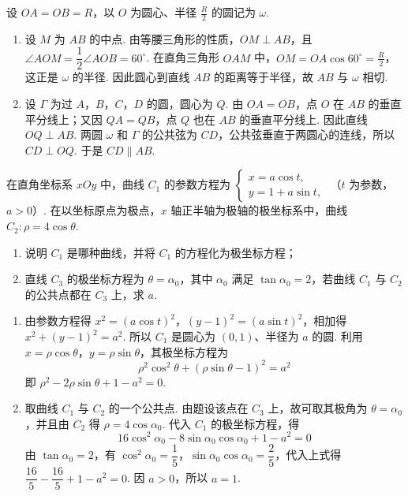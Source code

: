 \begin{solution}
设 \(OA=OB=R\)，以 \(O\) 为圆心、半径 \(\frac{R}{2}\) 的圆记为 \(\omega\).

\begin{enumerate}
\item 设 \(M\) 为 \(AB\) 的中点. 由等腰三角形的性质，\(OM\perp AB\)，且 \(\angle AOM=\dfrac12\angle AOB=60^\circ\). 在直角三角形 \(OAM\) 中，\(OM=OA\cos60^\circ=\frac{R}{2}\)，这正是 \(\omega\) 的半径. 因此圆心到直线 \(AB\) 的距离等于半径，故 \(AB\) 与 \(\omega\) 相切.
\item 设 \(\Gamma\) 为过 \(A\)，\(B\)，\(C\)，\(D\) 的圆，圆心为 \(Q\). 由 \(OA=OB\)，点 \(O\) 在 \(AB\) 的垂直平分线上；又因 \(QA=QB\)，点 \(Q\) 也在 \(AB\) 的垂直平分线上. 因此直线 \(OQ\perp AB\). 两圆 \(\omega\) 和 \(\Gamma\) 的公共弦为 \(CD\)，公共弦垂直于两圆心的连线，所以 \(CD\perp OQ\). 于是 \(CD\parallel AB\).
\end{enumerate}
\end{solution}

\begin{problem}

在直角坐标系 \(xOy\) 中，曲线 \(C_1\) 的参数方程为
\(\begin{cases}
x=a\cos t,\\
y=1+a\sin t,
\end{cases}\)
（\(t\) 为参数，\(a>0\)）.
在以坐标原点为极点，\(x\) 轴正半轴为极轴的极坐标系中，曲线 \(C_2:\rho=4\cos\theta\).

\begin{enumerate}
\item 说明 \(C_1\) 是哪种曲线，并将 \(C_1\) 的方程化为极坐标方程；
\item 直线 \(C_3\) 的极坐标方程为 \(\theta=\alpha_0\)，其中 \(\alpha_0\) 满足 \(\tan\alpha_0=2\)，若曲线 \(C_1\) 与 \(C_2\) 的公共点都在 \(C_3\) 上，求 \(a\).
\end{enumerate}
\end{problem}

\begin{solution}
\begin{enumerate}
\item 由参数方程得 \(x^2=(a\cos t)^2\)，\((y-1)^2=(a\sin t)^2\)，相加得 \(x^2+(y-1)^2=a^2\). 所以 \(C_1\) 是圆心为 \((0,1)\)、半径为 \(a\) 的圆. 利用 \(x=\rho\cos\theta\)，\(y=\rho\sin\theta\)，其极坐标方程为
\[
\rho^2\cos^2\theta+(\rho\sin\theta-1)^2=a^2
\]
即 \(\rho^2-2\rho\sin\theta+1-a^2=0\).
\item 取曲线 \(C_1\) 与 \(C_2\) 的一个公共点. 由题设该点在 \(C_3\) 上，故可取其极角为 \(\theta=\alpha_0\)，并且由 \(C_2\) 得 \(\rho=4\cos\alpha_0\). 代入 \(C_1\) 的极坐标方程，得
\[
16\cos^2\alpha_0-8\sin\alpha_0\cos\alpha_0+1-a^2=0
\]
由 \(\tan\alpha_0=2\)，有 \(\cos^2\alpha_0=\dfrac15\)，\(\sin\alpha_0\cos\alpha_0=\dfrac25\)，代入上式得 \(\dfrac{16}{5}-\dfrac{16}{5}+1-a^2=0\). 因 \(a>0\)，所以 \(a=1\).
\end{enumerate}
\end{solution}

